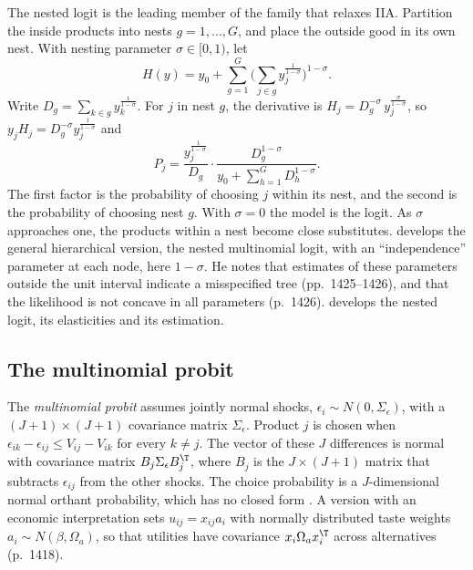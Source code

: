 The nested logit is the leading member of the family that relaxes IIA. Partition the inside products into nests
$g = 1, \dots, G$, and place the outside good in its own nest. With nesting parameter $\sigma \in [0, 1)$, let
\begin{equation}\label{eq:06-nestedH}
H(y) = y_0 + \sum_{g=1}^G\Big(\sum_{j\in g}y_j^{\frac{1}{1-\sigma}}\Big)^{1-\sigma}.
\end{equation}
Write $D_g = \sum_{k\in g}y_k^{\frac{1}{1-\sigma}}$. For $j$ in nest $g$, the derivative is
$H_j = D_g^{-\sigma}\,y_j^{\frac{\sigma}{1-\sigma}}$, so $y_jH_j = D_g^{-\sigma}y_j^{\frac{1}{1-\sigma}}$ and
\begin{equation*}
P_j = \frac{y_j^{\frac{1}{1-\sigma}}}{D_g}\cdot\frac{D_g^{1-\sigma}}{y_0 + \sum_{h=1}^G D_h^{1-\sigma}} .
\end{equation*}
The first factor is the probability of choosing $j$ within its nest, and the second is the probability of
choosing nest $g$. With $\sigma = 0$ the model is the logit. As $\sigma$ approaches one, the products within a
nest become close substitutes. \citet[sec.~3.10, pp.~1422--1425]{McFadden1984} develops the general
hierarchical version, the nested multinomial logit, with an ``independence'' parameter at each node, here
$1 - \sigma$. He notes that estimates of these parameters outside the unit interval indicate a misspecified tree
(pp.~1425--1426), and that the likelihood is not concave in all parameters (p.~1426).  develops
the nested logit, its elasticities and its estimation.

\subsection{The multinomial probit}\label{sec:06-probit}

The \emph{multinomial probit} assumes jointly normal shocks, $\epsilon_i \sim N(0, \Sigma_\epsilon)$, with a
$(J+1)\times(J+1)$ covariance matrix $\Sigma_\epsilon$. Product $j$ is chosen when
$\epsilon_{ik} - \epsilon_{ij} \le V_{ij} - V_{ik}$ for every $k \neq j$. The vector of these $J$ differences is
normal with covariance matrix $B_j\Sigma_\epsilon B_j^\T$, where $B_j$ is the $J\times(J+1)$ matrix that
subtracts $\epsilon_{ij}$ from the other shocks. The choice probability is a $J$-dimensional normal orthant
probability, which has no closed form \citep[sec.~3.8]{McFadden1984}. A version with an economic
interpretation sets $u_{ij} = x_{ij}a_i$ with normally distributed taste weights $a_i \sim N(\beta, \Omega_a)$, so
that utilities have covariance $x_i\Omega_a x_i^\T$ across alternatives (p.~1418).

